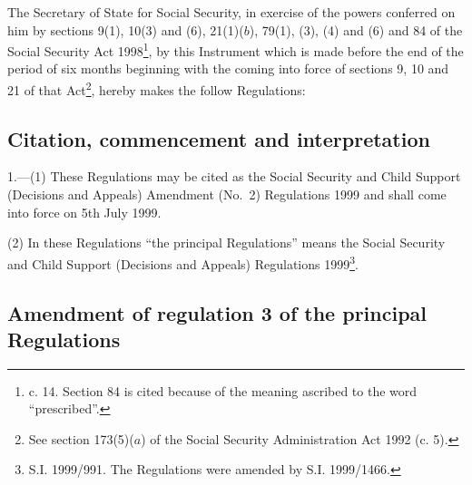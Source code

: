 \documentclass[12pt,a4paper]{article}
\title{\regstitle}
\author{S.I. 1999 No. 1623}
\date{Made
9th June 1999\\
Laid before Parliament
14th June 1999\\
Coming into force
5th July 1999}
\begin{document}
\maketitle

\noindent
The Secretary of State for Social Security, in exercise of the powers conferred on him by sections 9(1), 10(3) and (6), 21(1)($b$), 79(1), (3), (4) and (6) and 84 of the Social Security Act 1998\footnote{ c. 14. Section 84 is cited because of the meaning ascribed to the word “prescribed”.}, by this Instrument which is made before the end of the period of six months beginning with the coming into force of sections 9, 10 and 21 of that Act\footnote{\frenchspacing See section 173(5)($a$) of the Social Security Administration Act 1992 (c. 5).}, hereby makes the follow Regulations: 

{\sloppy

\tableofcontents

}

\bigskip

\setcounter{secnumdepth}{-2}

\subsection[1. Citation, commencement and interpretation]{Citation, commencement and interpretation}

1.---(1)  These Regulations may be cited as the Social Security and Child Support (Decisions and Appeals) Amendment (No.\ 2) Regulations 1999 and shall come into force on 5th July 1999.

(2) In these Regulations “the principal Regulations” means the Social Security and Child Support (Decisions and Appeals) Regulations 1999\footnote{\frenchspacing S.I. 1999/991. The Regulations were amended by S.I. 1999/1466.}.

\subsection[2. Amendment of regulation 3 of the principal Regulations]{Amendment of regulation 3 of the principal Regulations}
\end{document}
